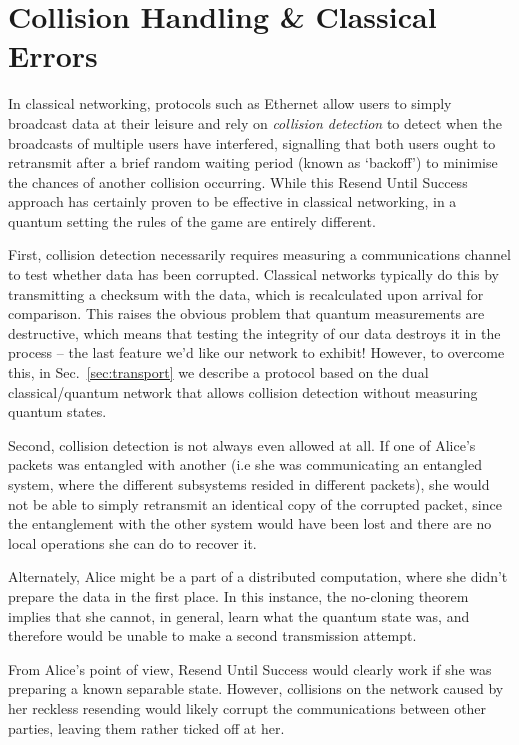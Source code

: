 \documentclass[aps,rmp,twocolumn,amsmath,amssymb,nofootinbib,superscriptaddress]{revtex4}
\begin{document}
%
%

\section{Collision Handling \& Classical Errors} \label{sec:collision}

In classical networking, protocols such as Ethernet allow users to simply broadcast data at their leisure and rely on \emph{collision detection} to detect when the broadcasts of multiple users have interfered, signalling that both users ought to retransmit after a brief random waiting period (known as `backoff') to minimise the chances of another collision occurring. While this {\sc Resend Until Success} approach has certainly proven to be effective in classical networking, in a quantum setting the rules of the game are entirely different.

First, collision detection necessarily requires measuring a communications channel to test whether data has been corrupted. Classical networks typically do this by transmitting a checksum with the data, which is recalculated upon arrival for comparison. This raises the obvious problem that quantum measurements are destructive, which means that testing the integrity of our data destroys it in the process -- the last feature we'd like our network to exhibit! However, to overcome this, in Sec.~\ref{sec:transport} we describe a protocol based on the dual classical/quantum network that allows collision detection without measuring quantum states.

Second, collision detection is not always even allowed at all. If one of Alice's packets was entangled with another (i.e she was communicating an entangled system, where the different subsystems resided in different packets), she would not be able to simply retransmit an identical copy of the corrupted packet, since the entanglement with the other system would have been lost and there are no local operations she can do to recover it.

Alternately, Alice might be a part of a distributed computation, where she didn't prepare the data in the first place. In this instance, the no-cloning theorem implies that she cannot, in general, learn what the quantum state was, and therefore would be unable to make a second transmission attempt.

From Alice's point of view, {\sc Resend Until Success} would clearly work if she was preparing a known separable state. However, collisions on the network caused by her reckless resending would likely corrupt the communications between other parties, leaving them rather ticked off at her.
\end{document}
